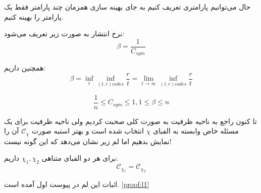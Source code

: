 حال می‌توانیم پارامتری تعریف کنیم به جای بهینه سازی همزمان چند پارامتر فقط یک پارامتر را بهینه کنیم.
\begin{definition}
	نرخ انتشار به صورت زیر تعریف می‌شود:
	$$\beta = \dfrac{1}{C_{sym}}$$
\end{definition}
همچنین داریم:
$$\beta = \inf\limits_{t} \inf\limits_{(t, r) codes} \dfrac{r}{t} = \lim\limits_{t \rightarrow \infty} \inf\limits_{(t, r) codes} \dfrac{r}{t}$$

\begin{remark}
	$$\dfrac{1}{n} \leq C_{sym} \leq 1, 1 \leq \beta \leq n$$
\end{remark}
تا کنون راجع به ناحیه ظرفیت به صورت کلی صحبت کردیم ولی ناحیه ظرفیت برای یک مسئله خاص وابسته به الفبای
$\chi$
انتخاب شده است و بهتر استبه صورت
$\mathscr{C}_\chi$
آن را نمایش بدهیم اما لم زیر نشان می‌دهد که این گونه نیست!
\begin{lemma}
	برای هر دو الفبای متناهی
	$\chi_1, \chi_2$
	داریم:
	$$\mathscr{C}_{\chi_1 }= \mathscr{C}_{\chi_2} $$
\end{lemma}
اثبات این لم در پیوست اول آمده است.
\ref{proof:l1}

